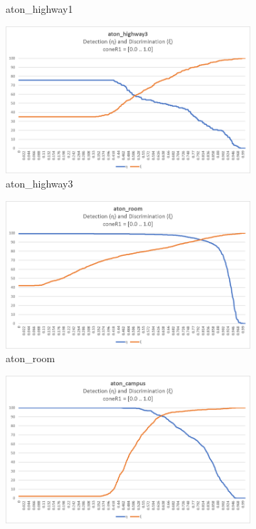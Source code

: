 \begin{figure}
\begin{subfigure}{.45\linewidth}
  \caption{aton\_highway1}
\end{subfigure}
\hfill
\begin{subfigure}{.45\linewidth}
  \includegraphics[width=1\linewidth]{figures/highway3_coneR1_response.jpg}
  \caption{aton\_highway3}
\end{subfigure}
\hfill
\begin{subfigure}{.45\linewidth}
  \includegraphics[width=1\linewidth]{figures/room_coneR1_response.jpg}
  \caption{aton\_room}
\end{subfigure}
\hfill
\begin{subfigure}{.45\linewidth}
  \includegraphics[width=1\linewidth]{figures/campus_coneR1_response.jpg}

\end{subfigure}
\end{figure}
